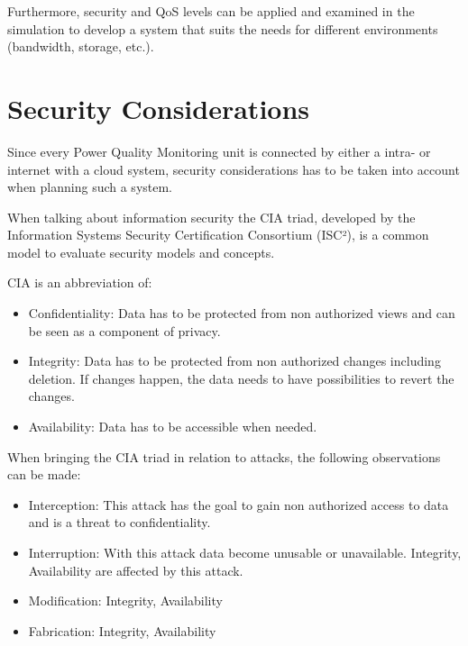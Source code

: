 Furthermore, security and QoS levels can be applied and examined in the simulation to develop a system that suits the needs for different environments (bandwidth, storage, etc.).

\section{Security Considerations}
Since every Power Quality Monitoring unit is connected by either a intra- or internet with a cloud system, security considerations has to be taken into account when planning such a system. 

When talking about information security the CIA triad, developed by the Information Systems Security Certification Consortium (ISC²), is a common model to evaluate security models and concepts\cite{cia_book}.

CIA is an abbreviation of\cite{cia_book}:
\begin{itemize}
	\item Confidentiality: Data has to be protected from non authorized views and can be seen as a component of privacy.
	\item Integrity: Data has to be protected from non authorized changes including deletion. If changes happen, the data needs to have possibilities to revert the changes.
	\item Availability: Data has to be accessible when needed.
\end{itemize}

When bringing the CIA triad in relation to attacks, the following observations can be made\cite{cia_book}: 
\begin{itemize}
	\item Interception: This attack has the goal to gain non authorized access to data and is a threat to confidentiality.
	\item Interruption: With this attack data become unusable or unavailable. Integrity, Availability are affected by this attack.
	\item Modification: Integrity, Availability
	\item Fabrication: Integrity, Availability
\end{itemize}


